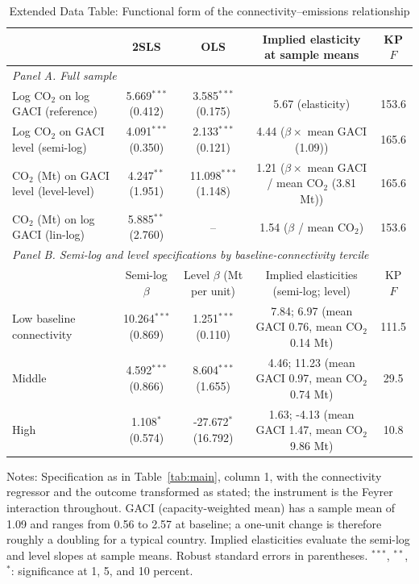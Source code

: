 \begin{table}[htbp]
\centering
\begin{threeparttable}
\caption{Extended Data Table: Functional form of the connectivity--emissions relationship}
\label{tab:funcform}
\footnotesize
\begin{tabular}{lcccc}
\toprule
 & 2SLS & OLS & Implied elasticity at sample means & KP $F$ \\
\midrule
\multicolumn{5}{l}{\textit{Panel A. Full sample}} \\
  Log CO$_2$ on log GACI (reference) & 5.669$^{***}$ (0.412) & 3.585$^{***}$ (0.175) & 5.67 (elasticity) & 153.6 \\
  Log CO$_2$ on GACI level (semi-log) & 4.091$^{***}$ (0.350) & 2.133$^{***}$ (0.121) & 4.44 ($\beta \times$ mean GACI (1.09)) & 165.6 \\
  CO$_2$ (Mt) on GACI level (level-level) & 4.247$^{**}$ (1.951) & 11.098$^{***}$ (1.148) & 1.21 ($\beta \times$ mean GACI / mean CO$_2$ (3.81 Mt)) & 165.6 \\
  CO$_2$ (Mt) on log GACI (lin-log) & 5.885$^{**}$ (2.760) & -- & 1.54 ($\beta$ / mean CO$_2$) & 153.6 \\
\midrule
\multicolumn{5}{l}{\textit{Panel B. Semi-log and level specifications by baseline-connectivity tercile}} \\
 & Semi-log $\beta$ & Level $\beta$ (Mt per unit) & Implied elasticities (semi-log; level) & KP $F$ \\
  Low baseline connectivity & 10.264$^{***}$ (0.869) & 1.251$^{***}$ (0.110) & 7.84; 6.97 (mean GACI 0.76, mean CO$_2$ 0.14 Mt) & 111.5 \\
  Middle & 4.592$^{***}$ (0.866) & 8.604$^{***}$ (1.655) & 4.46; 11.23 (mean GACI 0.97, mean CO$_2$ 0.74 Mt) & 29.5 \\
  High & 1.108$^{*}$ (0.574) & -27.672$^{*}$ (16.792) & 1.63; -4.13 (mean GACI 1.47, mean CO$_2$ 9.86 Mt) & 10.8 \\
\bottomrule
\end{tabular}
\begin{tablenotes}[flushleft]
\footnotesize
\item Notes: Specification as in Table~\ref{tab:main}, column 1, with the connectivity regressor and the outcome transformed as stated; the instrument is the Feyrer interaction throughout. GACI (capacity-weighted mean) has a sample mean of 1.09 and ranges from 0.56 to 2.57 at baseline; a one-unit change is therefore roughly a doubling for a typical country. Implied elasticities evaluate the semi-log and level slopes at sample means. Robust standard errors in parentheses. $^{***}$, $^{**}$, $^{*}$: significance at 1, 5, and 10 percent.
\end{tablenotes}
\end{threeparttable}
\end{table}

